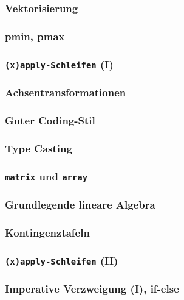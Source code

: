 \documentclass[paper=A4, pagesize, DIV=calc, smallheadings,
fontsize=12pt, expansion=false]{scrreprt}
\begin{document}
\subsubsection*{Vektorisierung}

\subsubsection*{pmin, pmax}

\subsubsection*{\texttt{(x)apply-Schleifen} (I)}

\subsubsection*{Achsentransformationen}


\subsubsection*{Guter Coding-Stil}

\subsubsection*{Type Casting}

\subsubsection*{\texttt{matrix} und \texttt{array}}

\subsubsection*{Grundlegende lineare Algebra}

\subsubsection*{Kontingenztafeln}

\subsubsection*{\texttt{(x)apply-Schleifen} (II)}

\subsubsection*{Imperative Verzweigung (I), if-else}
\end{document}
